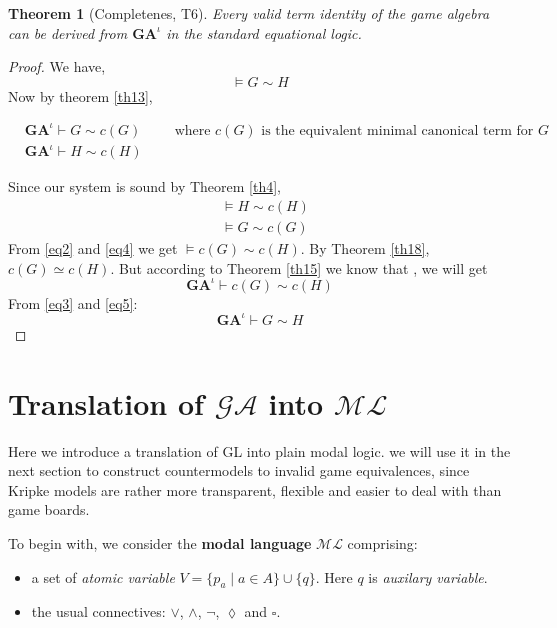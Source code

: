 \documentclass[10pt]{article}
\newcommand{\move}{\lozenge}
\newcommand{\Move}{\square}
\newcommand{\ml}{\mathcal{ML}}
\newcommand{\ga}{\mathcal{GA}}
\newcommand{\id}{\iota}
\newtheorem{theorem}{Theorem}
\begin{document}
		\begin{theorem}[Completenes, T6]
			Every valid term identity of the game algebra can be derived from $\textbf{GA}^\id$ in the standard equational logic.
		\end{theorem}
		\begin{proof}
		We have,
		\begin{equation}\label{eq2}
			\models G \sim H
		\end{equation}
		 Now by theorem \ref{th13}, 
		
		 \begin{equation} \label{eq3}
		 	\begin{split}
		 	& \textbf{GA}^\id \vdash G \sim c(G) \hspace{1cm}\text{where $c(G)$ is the equivalent minimal canonical term for $G$}\\ 
		 	& \textbf{GA}^\id \vdash H \sim c(H)
		 	\end{split}
		 \end{equation}
		 
		 Since our system is sound by Theorem \ref{th4}, 
		 \begin{equation}
		 	\begin{split}
		 		&\models  H \sim c(H) \label{eq4}\\		
		 		&\models G \sim c(G) 
		 	\end{split}
		 \end{equation}
		  From \ref{eq2} and \ref{eq4} we get $\models c(G) \sim c(H)$. By Theorem \ref{th18}, $c(G) \simeq c(H)$. But according to Theorem \ref{th15} we know that , we will get
		  \begin{equation}\label{eq5}
		  	\textbf{GA}^\id \vdash c(G) \sim c(H)
		  \end{equation}
		  From \ref{eq3} and \ref{eq5}:
		  \[
		  	\textbf{GA}^\id \vdash G \sim H
		  \]
		\end{proof}
		
		\section{Translation of $\ga$ into $\ml$}
		Here we introduce a translation of GL into plain modal logic. we will use it in the next section to construct countermodels to invalid game equivalences, since Kripke models are rather more transparent, flexible and easier to deal with than game boards.
		
		To begin with, we consider the \textbf{modal language} $\ml$ comprising:
		\begin{itemize}
			\item a set of \textit{atomic variable} $V =\{p_a\mid a\in A\} \cup \{q\}$. Here $q$ is \textit{auxilary variable}.
			
			\item the usual connectives: $\lor$, $\land$, $\neg$, $\move$ and $\Move$.
		\end{itemize}
		
\end{document}
